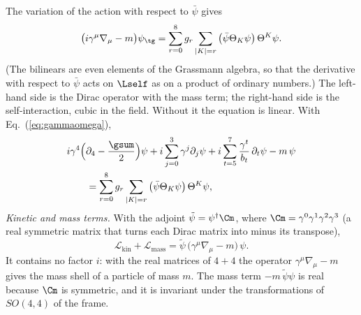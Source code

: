 The variation of the action with respect to $\bar\psi$ gives
\begin{equation}
\big(i\gamma^{\mu}\nabla_\mu-m\big)\psi_{\tg}=\sum_{r=0}^{8}g_r\sum_{|K|=r}\big(\bar\psi\Theta_K\psi\big)\,\Theta^{K}\psi .
\label{eq:dirac}
\end{equation}
(The bilinears are even elements of the Grassmann algebra, so that the derivative with respect to
$\bar\psi$ acts on $\Lself$ as on a product of ordinary numbers.) The left-hand side is the Dirac
operator with the mass term; the right-hand side is the self-interaction, cubic in the field.
Without it the equation is linear. With Eq.~(\ref{eq:gammaomega}),
\begin{equation}
\begin{aligned}
&i\gamma^{4}\Big(\partial_4-\frac{\gsum}{2}\Big)\psi+i\sum_{j=0}^{3}\gamma^{j}\partial_j\psi
+i\sum_{t=5}^{7}\frac{\gamma^{t}}{b_t}\,\partial_t\psi-m\,\psi\\
&\qquad=\sum_{r=0}^{8}g_r\sum_{|K|=r}\big(\bar\psi\Theta_K\psi\big)\,\Theta^{K}\psi,
\end{aligned}
\label{eq:diracexp}
\end{equation}
\emph{Kinetic and mass terms.} With the adjoint $\tilde\psi=\psi^\dagger\Cm$, where
$\Cm=\gamma^{0}\gamma^{1}\gamma^{2}\gamma^{3}$ (a real symmetric matrix that turns each Dirac matrix
into minus its transpose),
\begin{equation}
\mathcal L_{\mathrm{kin}}+\mathcal L_{\mathrm{mass}}=\tilde\psi\,\big(\gamma^{\mu}\nabla_\mu-m\big)\,\psi .
\label{eq:Lfree}
\end{equation}
It contains no factor $i$: with the real matrices of $4+4$ the operator $\gamma^{\mu}\nabla_\mu-m$
gives the mass shell of a particle of mass $m$. The mass term $-m\,\tilde\psi\psi$ is real because
$\Cm$ is symmetric, and it is invariant under the transformations of $SO(4,4)$ of the frame.

